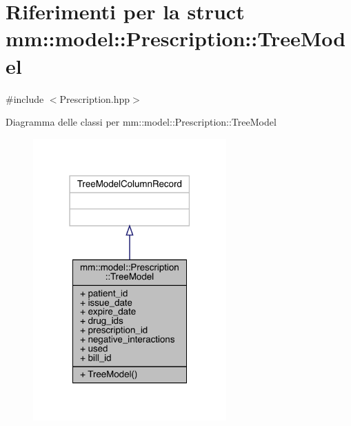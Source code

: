 \hypertarget{structmm_1_1model_1_1_prescription_1_1_tree_model}{}\section{Riferimenti per la struct mm\+:\+:model\+:\+:Prescription\+:\+:Tree\+Model}
\label{structmm_1_1model_1_1_prescription_1_1_tree_model}


{\ttfamily \#include $<$Prescription.\+hpp$>$}



Diagramma delle classi per mm\+:\+:model\+:\+:Prescription\+:\+:Tree\+Model\nopagebreak
\begin{figure}[H]
\begin{center}
\leavevmode
\includegraphics[width=210pt]{d8/d20/structmm_1_1model_1_1_prescription_1_1_tree_model__inherit__graph}
\end{center}
\end{figure}


